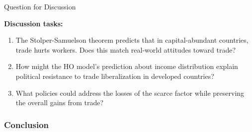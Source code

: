 \documentclass{beamer}
\begin{document}
\begin{frame}{Question for Discussion}

\textbf{Discussion tasks:}

\vspace{0.3cm}

\begin{enumerate}
    \item The Stolper-Samuelson theorem predicts that in capital-abundant countries, trade hurts workers. Does this match real-world attitudes toward trade?
    
    \vspace{0.3cm}
    
    \item How might the HO model's prediction about income distribution explain political resistance to trade liberalization in developed countries?
    
    \vspace{0.3cm}
    
    \item What policies could address the losses of the scarce factor while preserving the overall gains from trade?
\end{enumerate}

\end{frame}

\subsubsection{Conclusion}

\end{document}
